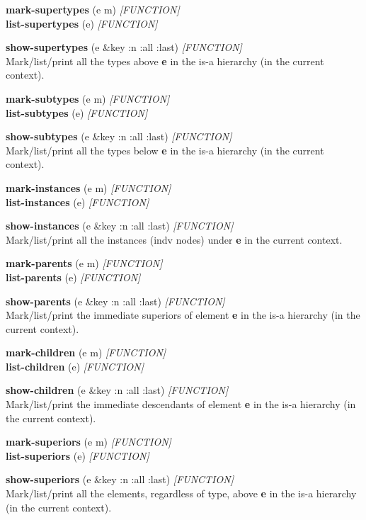 \documentclass[titlepage,twoside,openright,11pt]{article}
\begin{document}
\textbf{mark-supertypes} (e m) \emph{{[}FUNCTION{]}}\\
\textbf{list-supertypes} (e) \emph{{[}FUNCTION{]}}

\textbf{show-supertypes} (e \&key :n :all :last) \emph{{[}FUNCTION{]}\\
}Mark/list/print all the types above \textbf{e} in the is-a hierarchy
(in the current context).

\textbf{mark-subtypes} (e m) \emph{{[}FUNCTION{]}\\
}\textbf{list-subtypes} (e) \emph{{[}FUNCTION{]}}

\textbf{show-subtypes} (e \&key :n :all :last) \emph{{[}FUNCTION{]}}\\
Mark/list/print all the types below \textbf{e} in the is-a hierarchy (in
the current context).

\textbf{mark-instances} (e m) \emph{{[}FUNCTION{]}}\\
\textbf{list-instances} (e) \emph{{[}FUNCTION{]}}

\textbf{show-instances} (e \&key :n :all :last) \emph{{[}FUNCTION{]}}\\
Mark/list/print all the instances (indv nodes) under \textbf{e} in the
current context.

\textbf{mark-parents} (e m) \emph{{[}FUNCTION{]}}\\
\textbf{list-parents} (e) \emph{{[}FUNCTION{]}}

\textbf{show-parents} (e \&key :n :all :last) \emph{{[}FUNCTION{]}}\\
Mark/list/print the immediate superiors of element \textbf{e} in the
is-a hierarchy (in the current context).

\textbf{mark-children} (e m) \emph{{[}FUNCTION{]}}\\
\textbf{list-children} (e) \emph{{[}FUNCTION{]}}

\textbf{show-children} (e \&key :n :all :last) \emph{{[}FUNCTION{]}}\\
Mark/list/print the immediate descendants of element \textbf{e} in the
is-a hierarchy (in the current context).

\textbf{mark-superiors} (e m) \emph{{[}FUNCTION{]}}\\
\textbf{list-superiors} (e) \emph{{[}FUNCTION{]}}

\textbf{show-superiors} (e \&key :n :all :last) \emph{{[}FUNCTION{]}\\
}Mark/list/print all the elements, regardless of type, above \textbf{e}
in the is-a hierarchy (in the current context).
\end{document}
